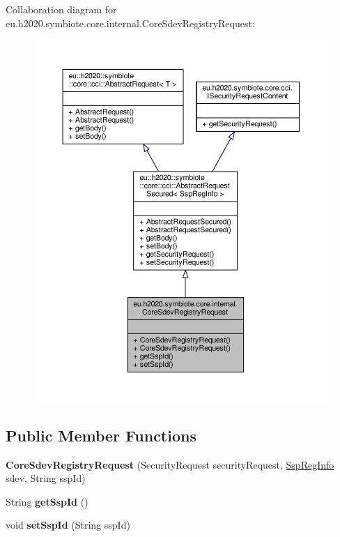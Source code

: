 Collaboration diagram for eu.\+h2020.\+symbiote.\+core.\+internal.\+Core\+Sdev\+Registry\+Request\+:
\nopagebreak
\begin{figure}[H]
\begin{center}
\leavevmode
\includegraphics[width=350pt]{classeu_1_1h2020_1_1symbiote_1_1core_1_1internal_1_1CoreSdevRegistryRequest__coll__graph}
\end{center}
\end{figure}
\subsection*{Public Member Functions}
\begin{DoxyCompactItemize}
\item 
\mbox{\label{classeu_1_1h2020_1_1symbiote_1_1core_1_1internal_1_1CoreSdevRegistryRequest_a3f711d443180992467ca9919400f3496}} 
{\bfseries Core\+Sdev\+Registry\+Request} (Security\+Request security\+Request, \hyperlink{classeu_1_1h2020_1_1symbiote_1_1cloud_1_1model_1_1ssp_1_1SspRegInfo}{Ssp\+Reg\+Info} sdev, String ssp\+Id)
\item 
\mbox{\label{classeu_1_1h2020_1_1symbiote_1_1core_1_1internal_1_1CoreSdevRegistryRequest_abd85ea3e91e1f637cf5453c9922e9717}} 
String {\bfseries get\+Ssp\+Id} ()
\item 
\mbox{\label{classeu_1_1h2020_1_1symbiote_1_1core_1_1internal_1_1CoreSdevRegistryRequest_a1c919a350d8ba920a4f500db6267e40d}} 
void {\bfseries set\+Ssp\+Id} (String ssp\+Id)
\end{DoxyCompactItemize}


